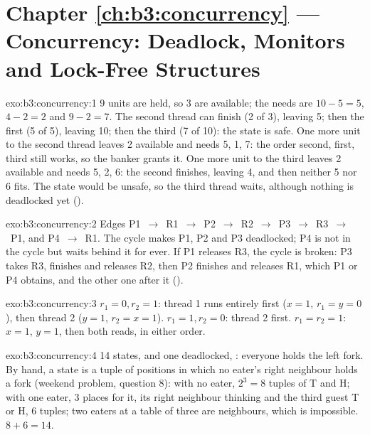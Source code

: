 \section*{Chapter \ref{ch:b3:concurrency} --- Concurrency: Deadlock, Monitors and Lock-Free Structures}

\begin{solution}{exo:b3:concurrency:1}
9 units are held, so 3 are available; the needs are $10 - 5 = 5$, $4 - 2 = 2$ and $9 - 2 = 7$. The second thread can finish (2 of 3), leaving 5; then the first (5 of 5), leaving 10; then the third (7 of 10): the state is safe. One more unit to the second thread leaves 2 available and needs 5, 1, 7: the order second, first, third still works, so the banker grants it. One more unit to the third leaves 2 available and needs 5, 2, 6: the second finishes, leaving 4, and then neither 5 nor 6 fits. The state would be unsafe, so the third thread waits, although nothing is deadlocked yet ().
\end{solution}

\begin{solution}{exo:b3:concurrency:2}
Edges P1~$\to$~R1~$\to$~P2~$\to$~R2~$\to$~P3~$\to$~R3~$\to$~P1, and P4~$\to$~R1. The cycle makes P1, P2 and P3 deadlocked; P4 is not in the cycle but waits behind it for ever. If P1 releases R3, the cycle is broken: P3 takes R3, finishes and releases R2, then P2 finishes and releases R1, which P1 or P4 obtains, and the other one after it ().
\end{solution}

\begin{solution}{exo:b3:concurrency:3}
$r_1 = 0, r_2 = 1$: thread 1 runs entirely first ($x = 1$, $r_1 = y = 0$), then thread 2 ($y = 1$, $r_2 = x = 1$). $r_1 = 1, r_2 = 0$: thread 2 first. $r_1 = r_2 = 1$: $x = 1$, $y = 1$, then both reads, in either order.
\end{solution}

\begin{solution}{exo:b3:concurrency:4}
14 states, and one deadlocked, : everyone holds the left fork. By hand, a state is a tuple of positions in which no eater's right neighbour holds a fork (weekend problem, question 8): with no eater, $2^3 = 8$ tuples of T and H; with one eater, 3 places for it, its right neighbour thinking and the third guest T or H, 6 tuples; two eaters at a table of three are neighbours, which is impossible. $8 + 6 = 14$.
\end{solution}


